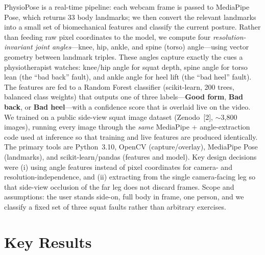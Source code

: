 \documentclass[11pt, letterpaper]{article}
\begin{document}
PhysioPose is a real-time pipeline: each webcam frame is passed to MediaPipe
Pose, which returns 33 body landmarks; we then convert the relevant landmarks
into a small set of biomechanical features and classify the current posture.
Rather than feeding raw pixel coordinates to the model, we compute four
\emph{resolution-invariant joint angles}---knee, hip, ankle, and spine (torso)
angle---using vector geometry between landmark triples. These angles capture
exactly the cues a physiotherapist watches: knee/hip angle for squat depth,
spine angle for torso lean (the ``bad back'' fault), and ankle angle for heel
lift (the ``bad heel'' fault). The features are fed to a Random Forest
classifier (scikit-learn, 200 trees, balanced class weights) that outputs one
of three labels---\textbf{Good form}, \textbf{Bad back}, or \textbf{Bad
heel}---with a confidence score that is overlaid live on the video. We trained
on a public side-view squat image dataset (Zenodo~[2], $\sim$3{,}800 images),
running every image through the \emph{same} MediaPipe + angle-extraction code
used at inference so that training and live features are produced identically.
The primary tools are Python~3.10, OpenCV (capture/overlay), MediaPipe Pose
(landmarks), and scikit-learn/pandas (features and model). Key design decisions
were (i) using angle features instead of pixel coordinates for camera- and
resolution-independence, and (ii) extracting from the single camera-facing leg
so that side-view occlusion of the far leg does not discard frames. Scope and
assumptions: the user stands side-on, full body in frame, one person, and we
classify a fixed set of three squat faults rather than arbitrary exercises.

\section{Key Results}
\end{document}
